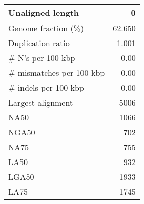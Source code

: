 \documentclass[12pt,a4paper]{article}
\begin{document}
\begin{table}[ht]
\begin{center}
\begin{tabular}{|l*{1}{|r}|}
Unaligned length & 0 \\ \hline
Genome fraction (\%) & 62.650 \\ \hline
Duplication ratio & 1.001 \\ \hline
\# N's per 100 kbp & 0.00 \\ \hline
\# mismatches per 100 kbp & 0.00 \\ \hline
\# indels per 100 kbp & 0.00 \\ \hline
Largest alignment & 5006 \\ \hline
NA50 & 1066 \\ \hline
NGA50 & 702 \\ \hline
NA75 & 755 \\ \hline
LA50 & 932 \\ \hline
LGA50 & 1933 \\ \hline
LA75 & 1745 \\ \hline
\end{tabular}
\end{center}
\end{table}
\end{document}
